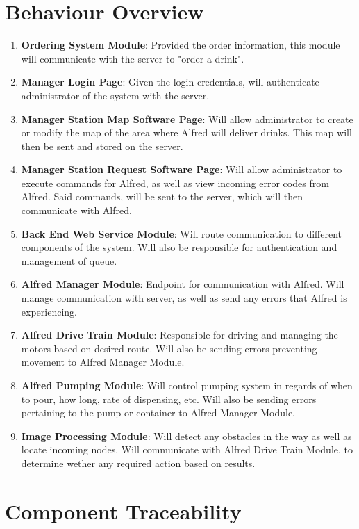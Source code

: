 \documentclass [10pt]{article}
\begin{document}
\section{Behaviour Overview}
\begin{enumerate}
	\item \textbf{Ordering System Module}: Provided the order information, this module will communicate with the server to "order a drink".
	\item \textbf{Manager Login Page}: Given the login credentials, will authenticate administrator of the system with the server.
	\item \textbf{Manager Station Map Software Page}: Will allow administrator to create or modify the map of the area where Alfred will deliver drinks. This map will then be sent and stored on the server.
	\item \textbf{Manager Station Request Software Page}: Will allow administrator to execute commands for Alfred, as well as view incoming error codes from Alfred. Said commands, will be sent to the server, which will then communicate with Alfred.
	\item \textbf{Back End Web Service Module}: Will route communication to different components of the system. Will also be responsible for authentication and management of queue. 
	\item \textbf{Alfred Manager Module}: Endpoint for communication with Alfred. Will manage communication with server, as well as send any errors that Alfred is experiencing.
	\item \textbf{Alfred Drive Train Module}: Responsible for driving and managing the motors based on desired route. Will also be sending errors preventing movement to Alfred Manager Module.
	\item \textbf{Alfred Pumping Module}: Will control pumping system in regards of when to pour, how long, rate of dispensing, etc. Will also be sending errors pertaining to the pump or container to Alfred Manager Module.
	\item \textbf{Image Processing Module}: Will detect any obstacles in the way as well as locate incoming nodes. Will communicate with Alfred Drive Train Module, to determine wether any required action based on results.
\end{enumerate}


\section{Component Traceability}
\end{document}

